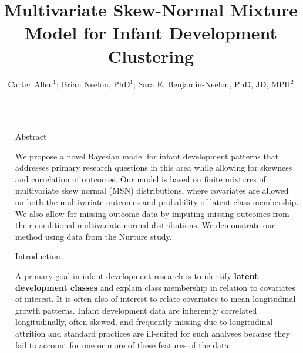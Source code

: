 \documentclass[final]{beamer}
\title{Multivariate Skew-Normal Mixture Model for Infant Development Clustering} %
\author{Carter Allen$^1$; Brian Neelon, PhD$^1$; Sara E. Benjamin-Neelon, PhD, JD, MPH$^2$} %
\institute{$^1$Department of Public Health Sciences, Medical University of South Carolina; $^2$Bloomberg School of Public Health, Johns Hopkins University}
\newlength{\sepwid}
\newlength{\onecolwid}
\begin{document}

\setlength{\belowcaptionskip}{2ex} %
\setlength\belowdisplayshortskip{2ex} %

\begin{frame}[t] %

\begin{columns}[t] %

\begin{column}{\sepwid}\end{column} %

\begin{column}{\onecolwid} %


\begin{alertblock}{Abstract}
 
We propose a novel Bayesian model for infant development patterns that addresses primary research questions in this area while allowing for skewness and correlation of outcomes. Our model is based on finite mixtures of multivariate skew normal (MSN) distributions, where covariates are allowed on both the multivariate outcomes and probability of latent class membership. We also allow for missing outcome data by imputing missing outcomes from their conditional multivariate normal distributions. We demonstrate our method using data from the Nurture study.

\end{alertblock}


\begin{block}{Introduction}

A primary goal in infant development research is to identify \textbf{latent development classes} and explain class membership in relation to covariates of interest. It is often also of interest to relate covariates to mean longitudinal growth patterns. Infant development data are inherently correlated longitudinally, often skewed, and frequently missing due to longitudinal attrition and standard practices are ill-suited for such analyses because they fail to account for one or more of these features of the data. 


\end{block}
\end{column}
\end{columns}
\end{frame}
\end{document}
